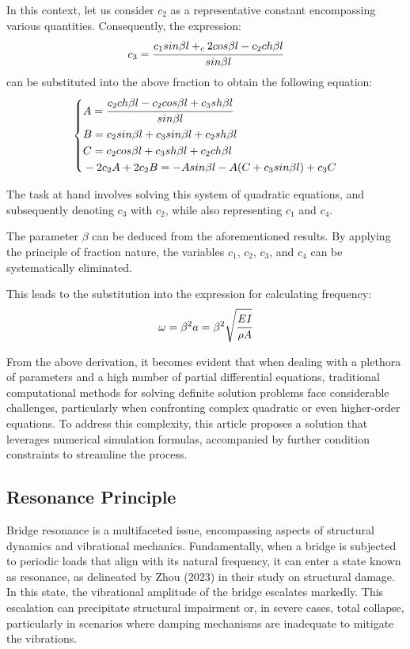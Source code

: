 \documentclass[conference]{IEEEtran}
\begin{document}
In this context, let us consider $c_2$ as a representative constant encompassing various quantities. Consequently, the expression:
\begin{equation}
c_3=\cfrac{c_1sin\beta{}l+_c2cos\beta{}l-c_2ch\beta{}l}{sin\beta{}l}
\end{equation}
can be substituted into the above fraction to obtain the following equation:
\begin{equation}
\left\{
\begin{aligned}
& A=\cfrac{c_2ch\beta{}l-c_2cos\beta{}l+c_3sh\beta{}l}{sin\beta{}l} \\
& B=c_2sin\beta{}l+c_3sin\beta{}l+c_2sh\beta{}l \\
& C=c_2cos\beta{}l+c_3sh\beta{}l+c_2ch\beta{}l \\
& -2c_2A+2c_2B=-Asin\beta{}l-A(C+c_3sin\beta{}l)+c_3C
\end{aligned}
\right.
\end{equation}

The task at hand involves solving this system of quadratic equations, and subsequently denoting $c_3$ with $c_2$, while also representing $c_1$ and $c_4$.

The parameter $\beta$ can be deduced from the aforementioned results. By applying the principle of fraction nature, the variables $c_1$, $c_2$, $c_3$, and $c_4$ can be systematically eliminated.

This leads to the substitution into the expression for calculating frequency:
\begin{equation}
\omega{}=\beta{}^{2}a=\beta{}^{2}\sqrt{\cfrac{EI}{\rho{}A}}
\end{equation}

From the above derivation, it becomes evident that when dealing with a plethora of parameters and a high number of partial differential equations, traditional computational methods for solving definite solution problems face considerable challenges, particularly when confronting complex quadratic or even higher-order equations. To address this complexity, this article proposes a solution that leverages numerical simulation formulas, accompanied by further condition constraints to streamline the process.

\subsection{Resonance Principle}
Bridge resonance is a multifaceted issue, encompassing aspects of structural dynamics and vibrational mechanics. Fundamentally, when a bridge is subjected to periodic loads that align with its natural frequency, it can enter a state known as resonance, as delineated by Zhou (2023) in their study on structural damage\cite{zhou2023damage}. In this state, the vibrational amplitude of the bridge escalates markedly. This escalation can precipitate structural impairment or, in severe cases, total collapse, particularly in scenarios where damping mechanisms are inadequate to mitigate the vibrations.
\end{document}
